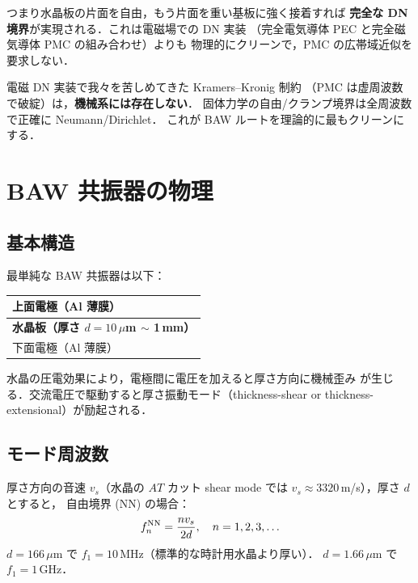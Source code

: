 \documentclass[11pt,a4paper]{article}
\begin{document}
つまり水晶板の片面を自由，もう片面を重い基板に強く接着すれば
\textbf{完全な DN 境界}が実現される．これは電磁場での DN 実装
（完全電気導体 PEC と完全磁気導体 PMC の組み合わせ）よりも
物理的にクリーンで，PMC の広帯域近似を要求しない．

\begin{tcolorbox}[colback=blue!5,colframe=blue!50!black,title=BAW の最大の強み]
電磁 DN 実装で我々を苦しめてきた Kramers--Kronig 制約
（PMC は虚周波数で破綻）は，\textbf{機械系には存在しない}．
固体力学の自由/クランプ境界は全周波数で正確に Neumann/Dirichlet．
これが BAW ルートを理論的に最もクリーンにする．
\end{tcolorbox}

\section{BAW 共振器の物理}

\subsection{基本構造}

最単純な BAW 共振器は以下：

\begin{center}
\begin{tabular}{l}
\hline
上面電極（Al 薄膜） \\
\hline
\textbf{水晶板（厚さ $d = 10\,\mu$m $\sim$ 1\,mm）} \\
\hline
下面電極（Al 薄膜） \\
\hline
\end{tabular}
\end{center}

水晶の圧電効果により，電極間に電圧を加えると厚さ方向に機械歪み
が生じる．交流電圧で駆動すると厚さ振動モード（thickness-shear or
thickness-extensional）が励起される．

\subsection{モード周波数}

厚さ方向の音速 $v_s$（水晶の $AT$ カット shear mode では
$v_s \approx 3320$\,m/s），厚さ $d$ とすると，
自由境界 (NN) の場合：
\begin{equation}
  f_n^{\rm NN} = \frac{n v_s}{2d},\quad n=1,2,3,\ldots
\end{equation}
$d = 166\,\mu$m で $f_1 = 10$\,MHz（標準的な時計用水晶より厚い）．
$d = 1.66\,\mu$m で $f_1 = 1$\,GHz．
\end{document}
